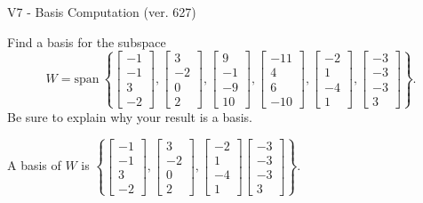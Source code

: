 \begin{exercise}
  \begin{exerciseTitle}V7 - Basis Computation (ver. 627)\end{exerciseTitle}
  \begin{exerciseStatement}
    Find a basis for the subspace 
\[W=\mathrm{span}\ \left\{\left[\begin{array}{r}
-1 \\
-1 \\
3 \\
-2
\end{array}\right] , \left[\begin{array}{r}
3 \\
-2 \\
0 \\
2
\end{array}\right] , \left[\begin{array}{r}
9 \\
-1 \\
-9 \\
10
\end{array}\right] , \left[\begin{array}{r}
-11 \\
4 \\
6 \\
-10
\end{array}\right] , \left[\begin{array}{r}
-2 \\
1 \\
-4 \\
1
\end{array}\right] , \left[\begin{array}{r}
-3 \\
-3 \\
-3 \\
3
\end{array}\right]\right\}.\]
 Be sure to explain why your result is a basis.


  \end{exerciseStatement}
  \begin{exerciseAnswer}
   A basis of \(W\) is  \(\left\{\left[\begin{array}{r}
-1 \\
-1 \\
3 \\
-2
\end{array}\right] , \left[\begin{array}{r}
3 \\
-2 \\
0 \\
2
\end{array}\right] , \left[\begin{array}{r}
-2 \\
1 \\
-4 \\
1
\end{array}\right] \left[\begin{array}{r}
-3 \\
-3 \\
-3 \\
3
\end{array}\right]\right\}\).
  


  \end{exerciseAnswer}
\end{exercise}